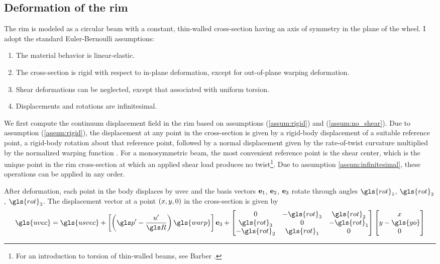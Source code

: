\documentclass[\rootdir/thesis.tex]{subfiles}
\begin{document}
\subsection{Deformation of the rim}
\label{sec:rim_strain_energy}

The rim is modeled as a circular beam with a constant, thin-walled cross-section having an axis of symmetry in the plane of the wheel. I adopt the standard Euler-Bernoulli assumptions:

\begin{enumerate}
	\item{The material behavior is linear-elastic.}\label{assum:elastic}
	\item{The cross-section is rigid with respect to in-plane deformation, except for out-of-plane warping deformation.}\label{assum:rigid}
	\item{Shear deformations can be neglected, except that associated with uniform torsion.}\label{assum:no_shear}
	\item{Displacements and rotations are infinitesimal.}\label{assum:infinitesimal}
\end{enumerate}

We first compute the continuum displacement field in the rim based on assumptions (\ref{assum:rigid}) and (\ref{assum:no_shear}). Due to assumption (\ref{assum:rigid}), the displacement at any point in the cross-section is given by a rigid-body displacement of a suitable reference point, a rigid-body rotation about that reference point, followed by a normal displacement given by the rate-of-twist curvature multiplied by the normalized warping function \cite{Timoshenko1961}. For a monosymmetric beam, the most convenient reference point is the shear center, which is the unique point in the rim cross-section at which an applied shear load produces no twist\footnote{For an introduction to torsion of thin-walled beams, see Barber \cite{Barber2011}.}. Due to assumption \ref{assum:infinitesimal}, these operations can be applied in any order.

After deformation, each point in the body displaces by \gls{uvec} and the basis vectors $\mathbf{e}_1$, $\mathbf{e}_2$, $\mathbf{e}_3$ rotate through angles $\gls{rot}_1$, $\gls{rot}_2$, $\gls{rot}_3$. The displacement vector at a point $(x, y, 0)$ in the cross-section is given by
\begin{equation}
\label{eq:u}
\gls{uvec} = \gls{usvec} + \left[\left(\p' - \frac{u'}{\R}\right)\gls{warp}\right]\eh +
\begin{bmatrix}
0        & -\gls{rot}_3& \gls{rot}_2\\
\gls{rot}_3 & 0        & -\gls{rot}_1\\
-\gls{rot}_2& \gls{rot}_1 & 0
\end{bmatrix}
\begin{bmatrix}\x\\\y - \gls{yo}\\0\end{bmatrix}
\end{equation}
\end{document}
